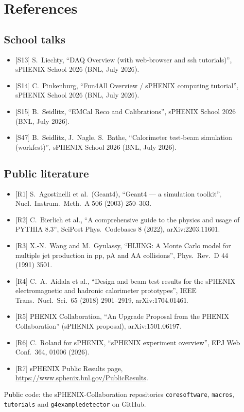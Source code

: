 \documentclass[11pt,letterpaper]{article}
\begin{document}
\section*{References}
\subsection*{School talks}
\begin{itemize}
\item {[S13]} S.~Liechty, ``DAQ Overview (with web-browser and ssh tutorials)'', sPHENIX School 2026 (BNL, July 2026).
\item {[S14]} C.~Pinkenburg, ``Fun4All Overview / sPHENIX computing tutorial'', sPHENIX School 2026 (BNL, July 2026).
\item {[S15]} B.~Seidlitz, ``EMCal Reco and Calibrations'', sPHENIX School 2026 (BNL, July 2026).
\item {[S47]} B.~Seidlitz, J.~Nagle, S.~Bathe, ``Calorimeter test-beam simulation (workfest)'', sPHENIX School 2026 (BNL, July 2026).
\end{itemize}
\subsection*{Public literature}
\begin{itemize}
\item {[R1]} S.~Agostinelli et al.\ (Geant4), ``Geant4 --- a simulation toolkit'', Nucl.\ Instrum.\ Meth.\ A 506 (2003) 250--303.
\item {[R2]} C.~Bierlich et al., ``A comprehensive guide to the physics and usage of PYTHIA 8.3'', SciPost Phys.\ Codebases 8 (2022), arXiv:2203.11601.
\item {[R3]} X.-N.~Wang and M.~Gyulassy, ``HIJING: A Monte Carlo model for multiple jet production in pp, pA and AA collisions'', Phys.\ Rev.\ D 44 (1991) 3501.
\item {[R4]} C.~A.~Aidala et al., ``Design and beam test results for the sPHENIX electromagnetic and hadronic calorimeter prototypes'', IEEE Trans.\ Nucl.\ Sci.\ 65 (2018) 2901--2919, arXiv:1704.01461.
\item {[R5]} PHENIX Collaboration, ``An Upgrade Proposal from the PHENIX Collaboration'' (sPHENIX proposal), arXiv:1501.06197.
\item {[R6]} C.~Roland for sPHENIX, ``sPHENIX experiment overview'', EPJ Web Conf.\ 364, 01006 (2026).
\item {[R7]} sPHENIX Public Results page, \url{https://www.sphenix.bnl.gov/PublicResults}.
\end{itemize}
Public code: the sPHENIX-Collaboration repositories \texttt{coresoftware}, \texttt{macros}, \texttt{tutorials} and \texttt{g4exampledetector} on GitHub.
\end{document}
